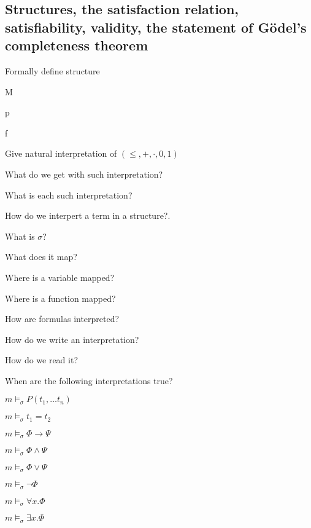 \documentclass[fleqn]{article}
\begin{document}
\subsection{Structures, the satisfaction relation, satisfiability, validity, the statement of Gödel's completeness theorem}
\begin{enumerate}
    {\color{green}\item Formally define structure}
    \begin{itemize}
        \item M
        {\color{green}\item p}
        \item f
    \end{itemize}
    {\color{red}\item Give natural interpretation of $(\leq, +, \cdot, 0, 1)$}
    \item What do we get with such interpretation?
    {\color{red}\item What is each such interpretation?}
    {\color{red}\item How do we interpert a term in a structure?.}
    \item What is $\sigma$?
    {\color{blue}\item What does it map?}
    {\color{red}\item Where is a variable mapped?}
    {\color{red}\item Where is a function mapped?}
    {\color{blue}\item How are formulas interpreted?}
    {\color{red}\item How do we write an interpretation?}
    {\color{red}\item How do we read it?}
    \item When are the following interpretations true?
    \begin{itemize}
        {\color{green}\item $m \models_{\sigma} P (t_1, \dots t_n)$}
        \item $m \models_{\sigma} t_1 = t_2$
        {\color{red}\item $m \models_{\sigma} \Phi \rightarrow \Psi$}
        \item $m \models_{\sigma} \Phi \wedge \Psi$
        \item $m \models_{\sigma} \Phi \vee \Psi$
        \item $m \models_{\sigma} \neg \Phi$
        {\color{green}\item $m \models_{\sigma} \forall x. \Phi$}
        {\color{green}\item $m \models_{\sigma} \exists x. \Phi$}

\end{itemize}
\end{enumerate}
\end{document}
